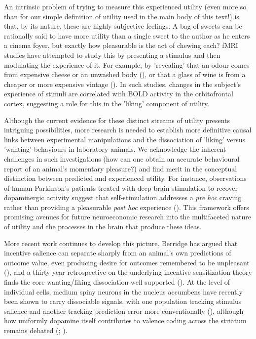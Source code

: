 An intrinsic problem of trying to measure this experienced utility (even more so than for our simple definition of utility used in the main body of this text!) is that, by its nature, these are highly subjective feelings. A bag of sweets can be rationally said to have more utility than a single sweet to the author as he enters a cinema foyer, but exactly how pleasurable is the act of chewing each? fMRI studies have attempted to study this by presenting a stimulus and then modulating the experience of it. For example, by 'revealing' that an odour comes from expensive cheese or an unwashed body (\cite{dearaujoCognitiveModulationOlfactory2005}), or that a glass of wine is from a cheaper or more expensive vintage (\cite{plassmannWhatCanAdvertisers2007}). In such studies, changes in the subject's experience of stimuli are correlated with BOLD activity in the orbitofrontal cortex, suggesting a role for this in the 'liking' component of utility.

Although the current evidence for these distinct streams of utility presents intriguing possibilities, more research is needed to establish more definitive causal links between experimental manipulations and the dissociation of 'liking' versus 'wanting' behaviours in laboratory animals. We acknowledge the inherent challenges in such investigations (how can one obtain an accurate behavioural report of an animal's momentary pleasure?) and find merit in the conceptual distinction between predicted and experienced utility. For instance, observations of human Parkinson's patients treated with deep brain stimulation to recover dopaminergic activity suggest that self-stimulation addresses a \textit{pre hoc} craving rather than providing a pleasurable \textit{post hoc} experience (\cite{berridgeBuildingNeurosciencePleasure2011}). This framework offers promising avenues for future neuroeconomic research into the multifaceted nature of utility and the processes in the brain that produce these ideas.

More recent work continues to develop this picture. Berridge has argued that incentive salience can separate sharply from an animal's own predictions of outcome value, even producing desire for outcomes remembered to be unpleasant (\cite{berridgeSeparatingDesirePrediction2023}), and a thirty-year retrospective on the underlying incentive-sensitization theory finds the core wanting/liking dissociation well supported (\cite{robinsonIncentiveSensitizationTheoryAddiction2025}). At the level of individual cells, medium spiny neurons in the nucleus accumbens have recently been shown to carry dissociable signals, with one population tracking stimulus salience and another tracking prediction error more conventionally (\cite{zachryD1D2Medium2024}), although how uniformly dopamine itself contributes to valence coding across the striatum remains debated (\cite{rodriguesDopamineNucleusAccumbens2025}; \cite{guillauminDisentanglingRoleNAc2023}).

